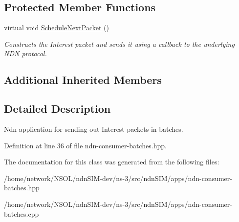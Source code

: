 \subsection*{Protected Member Functions}
\begin{DoxyCompactItemize}
\item 
virtual void \hyperlink{classns3_1_1ndn_1_1ConsumerBatches_ad4c174d128fa77f899e209c675d6f7e0}{Schedule\+Next\+Packet} ()\hypertarget{classns3_1_1ndn_1_1ConsumerBatches_ad4c174d128fa77f899e209c675d6f7e0}{}\label{classns3_1_1ndn_1_1ConsumerBatches_ad4c174d128fa77f899e209c675d6f7e0}

\begin{DoxyCompactList}\small\item\em Constructs the Interest packet and sends it using a callback to the underlying N\+DN protocol. \end{DoxyCompactList}\end{DoxyCompactItemize}
\subsection*{Additional Inherited Members}


\subsection{Detailed Description}
Ndn application for sending out Interest packets in batches. 

Definition at line 36 of file ndn-\/consumer-\/batches.\+hpp.



The documentation for this class was generated from the following files\+:\begin{DoxyCompactItemize}
\item 
/home/network/\+N\+S\+O\+L/ndn\+S\+I\+M-\/dev/ns-\/3/src/ndn\+S\+I\+M/apps/ndn-\/consumer-\/batches.\+hpp\item 
/home/network/\+N\+S\+O\+L/ndn\+S\+I\+M-\/dev/ns-\/3/src/ndn\+S\+I\+M/apps/ndn-\/consumer-\/batches.\+cpp\end{DoxyCompactItemize}
